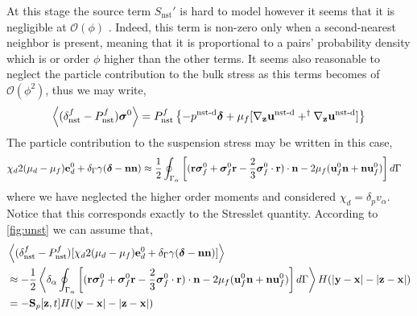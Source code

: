 At this stage the source term $S_\text{nst}'$ is hard to model however it seems that it is negligible at $\mathcal{O}(\phi)$ \citet{zhang2021ensemble}. 
Indeed, this term is non-zero only when a second-nearest neighbor is present, meaning that it is proportional to a pairs' probability density which is or order $\phi$ higher than the other terms. 
It seems also reasonable to neglect the particle contribution to the bulk stress as this terms becomes of $\mathcal{O}(\phi^2)$, thus we may write, 
\begin{equation}
    \left<(\delta_\text{nst}^f - P_\text{nst}^f) \bm\sigma^0\right>
    =
    P_\text{nst}^f\left\{
        -p^\text{nst-d}\bm\delta 
        + \mu_f [{\mathbf{\nabla}_\textbf{z}} \textbf{u}^\text{nst-d}+^\dagger{\mathbf{\nabla}_\textbf{z}} \textbf{u}^\text{nst-d}]
    \right\}
\end{equation}
The particle contribution to the suspension stress may be written in this case, 
\begin{align}
    {\chi_d  2 (\mu_d-\mu_f)\textbf{e}_d^0 
    + \delta_\Gamma \gamma (\bm\delta - \textbf{nn})}
    &\approx
    \frac{1}{2}
     \oint_{\Gamma_{\alpha}} 
        \left[(\textbf{r}\bm\sigma_f^0 
        + \bm\sigma_f^0 \textbf{r}
        - \frac{2}{3}\bm\sigma_f^0 \cdot \textbf{r}
        )\cdot \textbf{n} 
        - 2\mu_f (
            \textbf{u}_f^0 \textbf{n}
            + \textbf{n}\textbf{u}_f^0 
        )\right]
     d\Gamma
\end{align}
where we have neglected the higher order moments and considered $\chi_d = \delta_p v_\alpha$. 
Notice that this corresponds exactly to the Stresslet quantity. 
According to \ref{fig:unst} we can assume that, 
\begin{align}
    &\left<(\delta_\text{nst}^f - P_\text{nst}^f)[\chi_d  2 (\mu_d-\mu_f)\textbf{e}_d^0 
    + \delta_\Gamma \gamma (\bm\delta - \textbf{nn})]\right>\nonumber \\
    &\approx
    -\frac{1}{2}
     \left<\delta_\alpha \oint_{\Gamma_{\alpha}} 
        \left[(\textbf{r}\bm\sigma_f^0 
        + \bm\sigma_f^0 \textbf{r}
        - \frac{2}{3}\bm\sigma_f^0 \cdot \textbf{r}
        )\cdot \textbf{n} 
        - 2\mu_f (
            \textbf{u}_f^0 \textbf{n}
            + \textbf{n}\textbf{u}_f^0 
        )\right]
     d\Gamma\right>
    H(|\textbf{y}- \textbf{x}| - |\textbf{z} -\textbf{x}|)\nonumber \\
    &= -\textbf{S}_p[\textbf{z},t]
    H(|\textbf{y}- \textbf{x}| - |\textbf{z} -\textbf{x}|)
\end{align}
